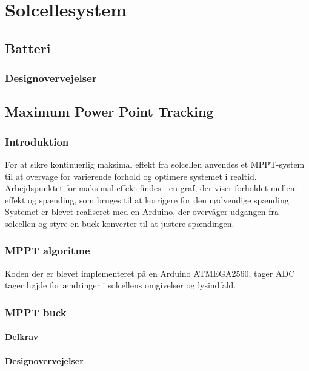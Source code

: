 \documentclass[../main.tex]{subfiles}
\begin{document}
\chapter{Solcellesystem} \label{Chap:Solcellesystem}

\section{Batteri}

    \subsection{Designovervejelser}

\section{Maximum Power Point Tracking}

    \subsection{Introduktion}

    For at sikre kontinuerlig maksimal effekt fra solcellen anvendes et MPPT-system til at overvåge for varierende forhold og optimere systemet i realtid. Arbejdspunktet for maksimal effekt findes i en graf, der viser forholdet mellem effekt og spænding, som bruges til at korrigere for den nødvendige spænding. Systemet er blevet realiseret med en Arduino, der overvåger udgangen fra solcellen og styre en buck-konverter til at justere spændingen.

    \subsection{MPPT algoritme}
    
    Koden der er blevet implementeret på en Arduino ATMEGA2560, tager ADC tager højde for ændringer i solcellens omgivelser og lysindfald. 


    \subsection{MPPT buck}
    
        \subsubsection{Delkrav}
        
        \subsubsection{Designovervejelser}
        
\end{document}
